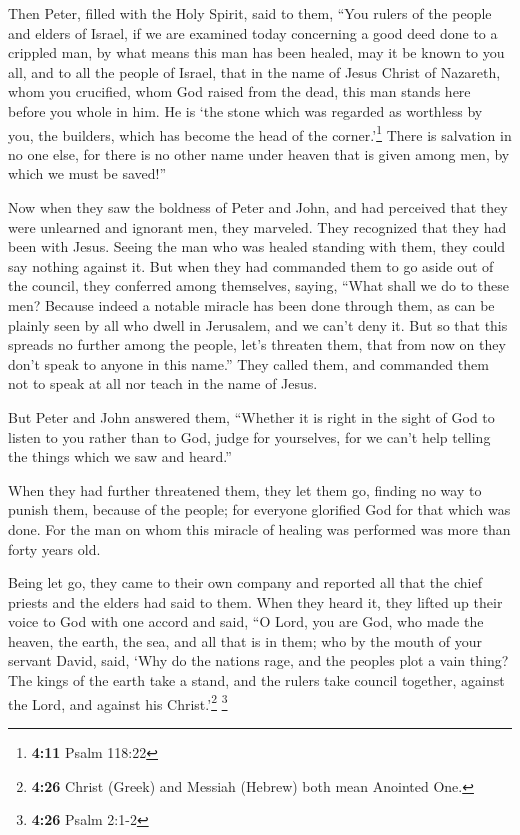  Then Peter, filled with the Holy Spirit, said to them,
``You rulers of the people and elders of Israel,  if we
are examined today concerning a good deed done to a crippled man, by
what means this man has been healed,  may it be known to
you all, and to all the people of Israel, that in the name of Jesus
Christ of Nazareth, whom you crucified, whom God raised from the dead,
this man stands here before you whole in him.  He is `the
stone which was regarded as worthless by you, the builders, which has
become the head of the corner.'\footnote{\textbf{4:11} Psalm 118:22}
 There is salvation in no one else, for there is no other
name under heaven that is given among men, by which we must be saved!''

 Now when they saw the boldness of Peter and John, and
had perceived that they were unlearned and ignorant men, they marveled.
They recognized that they had been with Jesus.  Seeing
the man who was healed standing with them, they could say nothing
against it.  But when they had commanded them to go aside
out of the council, they conferred among themselves, 
saying, ``What shall we do to these men? Because indeed a notable
miracle has been done through them, as can be plainly seen by all who
dwell in Jerusalem, and we can't deny it.  But so that
this spreads no further among the people, let's threaten them, that from
now on they don't speak to anyone in this name.''  They
called them, and commanded them not to speak at all nor teach in the
name of Jesus.

 But Peter and John answered them, ``Whether it is right
in the sight of God to listen to you rather than to God, judge for
yourselves,  for we can't help telling the things which
we saw and heard.''

 When they had further threatened them, they let them go,
finding no way to punish them, because of the people; for everyone
glorified God for that which was done.  For the man on
whom this miracle of healing was performed was more than forty years
old.

 Being let go, they came to their own company and
reported all that the chief priests and the elders had said to them.
 When they heard it, they lifted up their voice to God
with one accord and said, ``O Lord, you are God, who made the heaven,
the earth, the sea, and all that is in them;  who by the
mouth of your servant David, said, `Why do the nations rage, and the
peoples plot a vain thing?  The kings of the earth take a
stand, and the rulers take council together, against the Lord, and
against his Christ.'\footnote{\textbf{4:26} Christ (Greek) and Messiah
  (Hebrew) both mean Anointed One.} \footnote{\textbf{4:26} Psalm 2:1-2}

